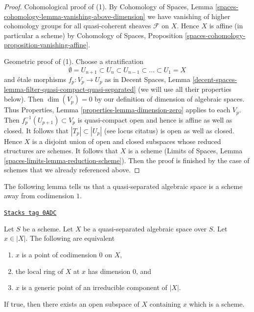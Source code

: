 \begin{proof}
\medskip\noindent
Cohomological proof of (1). By Cohomology of Spaces, Lemma
\ref{spaces-cohomology-lemma-vanishing-above-dimension}
we have vanishing of higher cohomology groups for all
quasi-coherent sheaves $\mathcal{F}$ on $X$. Hence $X$
is affine (in particular a scheme) by
Cohomology of Spaces, Proposition
\ref{spaces-cohomology-proposition-vanishing-affine}.

\medskip\noindent
Geometric proof of (1). Choose a stratification
$$
\emptyset = U_{n + 1} \subset
U_n \subset U_{n - 1} \subset \ldots \subset U_1 = X
$$
and \'etale morphisms $f_p : V_p \to U_p$ as in
Decent Spaces, Lemma
\ref{decent-spaces-lemma-filter-quasi-compact-quasi-separated}
(we will use all their properties below).
Then $\dim(V_p) = 0$ by our definition of dimension of algebraic
spaces. Thus Properties, Lemma \ref{properties-lemma-dimension-zero}
applies to each $V_p$. Then $f_p^{-1}(U_{p + 1}) \subset V_p$
is quasi-compact open and hence is affine as well as closed.
It follows that $|T_p| \subset |U_p|$ (see locus citatus)
is open as well as closed. Hence $X$ is a disjoint union
of open and closed subspaces whose reduced structures are schemes.
It follows that $X$ is a scheme
(Limits of Spaces, Lemma \ref{spaces-limits-lemma-reduction-scheme}).
Then the proof is finished by the case of schemes that we
already referenced above.
\end{proof}

The following lemma tells us that a quasi-separated algebraic space
is a scheme away from codimension $1$.

\begin{lemma}
\label{spaces-over-fields-lemma-generic-point-in-schematic-locus}
\href{https://stacks.math.columbia.edu/tag/0ADC}{\texttt{Stacks tag 0ADC}}

Let $S$ be a scheme. Let $X$ be a quasi-separated algebraic space over $S$.
Let $x \in |X|$. The following are equivalent
\begin{enumerate}
\item $x$ is a point of codimension $0$ on $X$,
\item the local ring of $X$ at $x$ has dimension $0$, and
\item $x$ is a generic point of an irreducible component of $|X|$.
\end{enumerate}
If true, then there exists an open subspace of $X$
containing $x$ which is a scheme.
\end{lemma}

